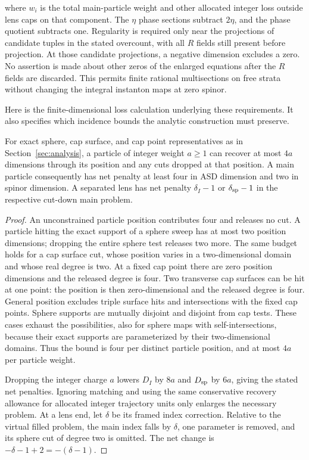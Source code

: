 \begin{definition}
\begin{enumerate}[label=(\roman*)]
where $w_i$ is the total main-particle weight and other allocated integer
loss outside lens caps on that component.  The $\eta$ phase sections
subtract $2\eta$, and the phase quotient subtracts one.  Regularity is
required only near the projections of candidate tuples in the stated
overcount, with all $R$ fields still present before projection.  At those
candidate projections, a negative dimension excludes a zero.  No
assertion is made about other zeros of the enlarged equations after the
$R$ fields are discarded.  This permits finite rational multisections
on free strata without changing the integral instanton maps at zero
spinor.
\end{enumerate}
\end{definition}

Here is the finite-dimensional loss calculation underlying these
requirements.  It also specifies which incidence bounds the analytic
construction must preserve.
\begin{lemma}\label{lem:indices:loss-budget}
For exact sphere, cap surface, and cap point representatives as in
Section~\ref{sec:analysis}, a particle of integer weight $a\ge1$ can
recover at most $4a$ dimensions through its position and any cuts dropped
at that position.  A main particle consequently has net penalty at least
four in ASD dimension and two in spinor dimension.  A separated lens has
net penalty $\delta_I-1$ or $\delta_{\rm sp}-1$ in the respective
cut-down main problem.
\end{lemma}
\begin{proof}
An unconstrained particle position contributes four and releases no cut.
A particle hitting the exact support of a sphere sweep has at most two
position dimensions; dropping the entire sphere test releases two more.
The same budget holds for a cap surface cut, whose position varies in a
two-dimensional domain and whose real degree is two.  At a fixed cap point
there are zero position dimensions and the released degree is four.
Two transverse cap surfaces can be hit at one point: the position is
then zero-dimensional and the released degree is four.  General position
excludes triple surface hits and intersections with the fixed cap points.
Sphere supports are mutually disjoint and disjoint from cap tests.
These cases exhaust the possibilities, also for sphere maps with
self-intersections, because their exact supports are parameterized by
their two-dimensional domains.  Thus the bound is four per distinct
particle position, and at most $4a$ per particle weight.

Dropping the integer charge $a$ lowers $D_I$ by $8a$ and $D_{\rm sp}$ by
$6a$, giving the stated net penalties.  Ignoring matching and using the
same conservative recovery allowance for allocated integer trajectory
units only enlarges the necessary problem.  At a lens end, let $\delta$
be its framed index correction.  Relative to the virtual filled problem,
the main index falls by $\delta$, one parameter is removed, and its
sphere cut of degree two is omitted.  The net change is $-\delta-1+2
=-(\delta-1)$.
\end{proof}

